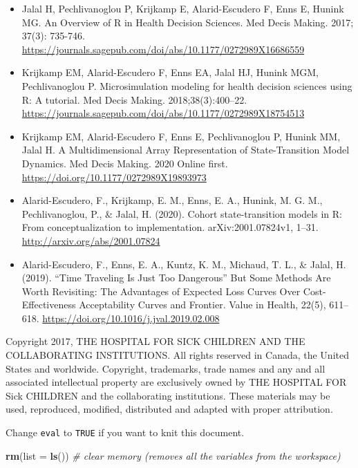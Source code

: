 \documentclass[
]{article}
\newenvironment{Shaded}{\begin{snugshade}}{\end{snugshade}}
\newcommand{\CommentTok}[1]{\textcolor[rgb]{0.56,0.35,0.01}{\textit{#1}}}
\newcommand{\DataTypeTok}[1]{\textcolor[rgb]{0.13,0.29,0.53}{#1}}
\newcommand{\KeywordTok}[1]{\textcolor[rgb]{0.13,0.29,0.53}{\textbf{#1}}}
\newcommand{\NormalTok}[1]{#1}
\begin{document}
\begin{itemize}
\item
  Jalal H, Pechlivanoglou P, Krijkamp E, Alarid-Escudero F, Enns E,
  Hunink MG. An Overview of R in Health Decision Sciences. Med Decis
  Making. 2017; 37(3): 735-746.
  \url{https://journals.sagepub.com/doi/abs/10.1177/0272989X16686559}
\item
  Krijkamp EM, Alarid-Escudero F, Enns EA, Jalal HJ, Hunink MGM,
  Pechlivanoglou P. Microsimulation modeling for health decision
  sciences using R: A tutorial. Med Decis Making. 2018;38(3):400--22.
  \url{https://journals.sagepub.com/doi/abs/10.1177/0272989X18754513}
\item
  Krijkamp EM, Alarid-Escudero F, Enns E, Pechlivanoglou P, Hunink MM,
  Jalal H. A Multidimensional Array Representation of State-Transition
  Model Dynamics. Med Decis Making. 2020 Online first.
  \url{https://doi.org/10.1177/0272989X19893973}
\item
  Alarid-Escudero, F., Krijkamp, E. M., Enns, E. A., Hunink, M. G. M.,
  Pechlivanoglou, P., \& Jalal, H. (2020). Cohort state-transition
  models in R: From conceptualization to implementation.
  arXiv:2001.07824v1, 1--31. \url{http://arxiv.org/abs/2001.07824}
\item
  Alarid-Escudero, F., Enns, E. A., Kuntz, K. M., Michaud, T. L., \&
  Jalal, H. (2019). ``Time Traveling Is Just Too Dangerous'' But Some
  Methods Are Worth Revisiting: The Advantages of Expected Loss Curves
  Over Cost-Effectiveness Acceptability Curves and Frontier. Value in
  Health, 22(5), 611--618.
  \url{https://doi.org/10.1016/j.jval.2019.02.008}
\end{itemize}

Copyright 2017, THE HOSPITAL FOR SICK CHILDREN AND THE COLLABORATING
INSTITUTIONS. All rights reserved in Canada, the United States and
worldwide. Copyright, trademarks, trade names and any and all associated
intellectual property are exclusively owned by THE HOSPITAL FOR Sick
CHILDREN and the collaborating institutions. These materials may be
used, reproduced, modified, distributed and adapted with proper
attribution.

\newpage

Change \texttt{eval} to \texttt{TRUE} if you want to knit this document.

\begin{Shaded}
\begin{Highlighting}[]
\KeywordTok{rm}\NormalTok{(}\DataTypeTok{list =} \KeywordTok{ls}\NormalTok{())      }\CommentTok{# clear memory (removes all the variables from the workspace)}
\end{Highlighting}
\end{Shaded}
\end{document}
